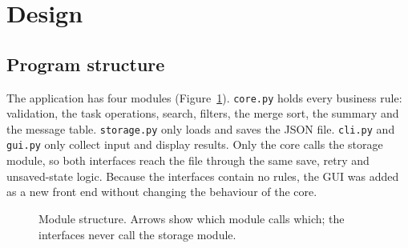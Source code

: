 \documentclass[11pt,a4paper]{article}
\newcommand{\code}[1]{\texttt{#1}}
\begin{document}
\section{Design}
\label{sec:design}

\subsection{Program structure}
The application has four modules (Figure~\ref{fig:modules}). \code{core.py}
holds every business rule: validation, the task operations, search, filters,
the merge sort, the summary and the message table. \code{storage.py} only
loads and saves the JSON file. \code{cli.py} and \code{gui.py} only collect
input and display results. Only the core calls the storage module, so both
interfaces reach the file through the same save, retry and unsaved-state
logic. Because the interfaces contain no rules, the GUI was added as a new
front end without changing the behaviour of the core.

\begin{figure}[ht]
\centering
{}
\caption{Module structure. Arrows show which module calls which; the
interfaces never call the storage module.}
\label{fig:modules}
\end{figure}
\end{document}
